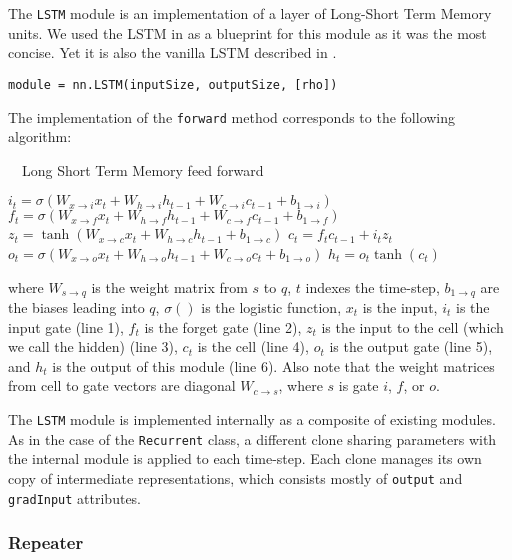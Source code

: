 \documentclass{article} %
\providecommand{\inlinecode}[1]{\texttt{#1}}
\begin{document}
The \inlinecode{LSTM} module is an implementation of a layer of 
Long-Short Term Memory units\cite{hochreiter1997long}. 
We used the LSTM in \cite{graves2013speech} as a blueprint for this module as it was the most concise. 
Yet it is also the vanilla LSTM described in \cite{greff2015lstm}.

\begin{verbatim}
module = nn.LSTM(inputSize, outputSize, [rho])
\end{verbatim}

The implementation of the \inlinecode{forward} method corresponds to the following algorithm:

\begin{algorithm}
\caption{~~Long Short Term Memory feed forward}
\label{alg:lstm}
\begin{algorithmic}[1]
\State $i_t = \sigma(W_{x\rightarrow i}x_t + W_{h\rightarrow i}h_{t-1} + W_{c \rightarrow i}c_{t-1} + b_{1 \rightarrow i})$
\State $f_t = \sigma(W_{x\rightarrow f}x_t + W_{h\rightarrow f}h_{t-1} + W_{c\rightarrow f}c_{t-1} + b_{1\rightarrow f})$
\State $z_t = \tanh(W_{x\rightarrow c}x_t + W_{h\rightarrow c}h_{t−1} + b_{1\rightarrow c})$
\State $c_t = f_t c_{t-1} + i_t z_t$
\State $o_t = \sigma(W_{x\rightarrow o}x_t + W_{h\rightarrow o}h_{t−1} + W_{c\rightarrow o}c_t + b_{1\rightarrow o})$
\State $h_t = o_t\tanh(c_t)$
\end{algorithmic}
\end{algorithm}

where $W_{s\rightarrow q}$ is the weight matrix from $s$ to $q$, $t$ indexes the time-step, 
$b_{1\rightarrow q}$ are the biases leading into $q$, $\sigma()$ is the logistic function, 
$x_t$ is the input, $i_t$ is the input gate (line 1), $f_t$ is the forget gate (line 2), 
$z_t$ is the input to the cell (which we call the hidden) (line 3), $c_t$ is the cell (line 4), 
$o_t$ is the output gate (line 5), and $h_t$ is the output of this module (line 6). 
Also note that the weight matrices from cell to gate vectors are diagonal $W_{c\rightarrow s}$, 
where $s$ is gate $i$, $f$, or $o$.

The \inlinecode{LSTM} module is implemented internally as a composite of existing modules.
As in the case of the \inlinecode{Recurrent} class, a different clone sharing parameters with the internal module 
is applied to each time-step. Each clone manages its own copy of intermediate representations, 
which consists mostly of \inlinecode{output} and \inlinecode{gradInput} attributes.

\subsubsection{Repeater}
\end{document}
